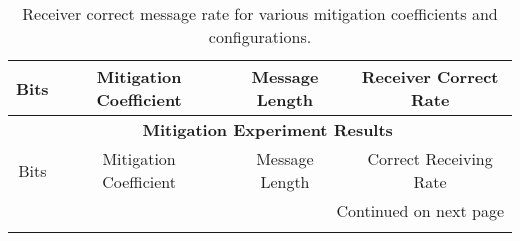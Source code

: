 \documentclass[10pt,a4paper]{article}
\begin{document}
\begin{center}
\begin{longtable}{cccc}
\caption{Receiver correct message rate for various mitigation coefficients and configurations.} \\
\toprule
Bits & Mitigation Coefficient & Message Length & Receiver Correct Rate \\
\midrule
\endfirsthead

\multicolumn{4}{c}{{\bfseries \tablename\ \thetable{} Mitigation Experiment Results}} \\
\toprule
Bits & Mitigation Coefficient & Message Length & Correct Receiving Rate \\
\midrule
\endhead

\midrule \multicolumn{4}{r}{{Continued on next page}} \\
\endfoot

\bottomrule
\endlastfoot


\end{longtable}
\end{center}
\end{document}
